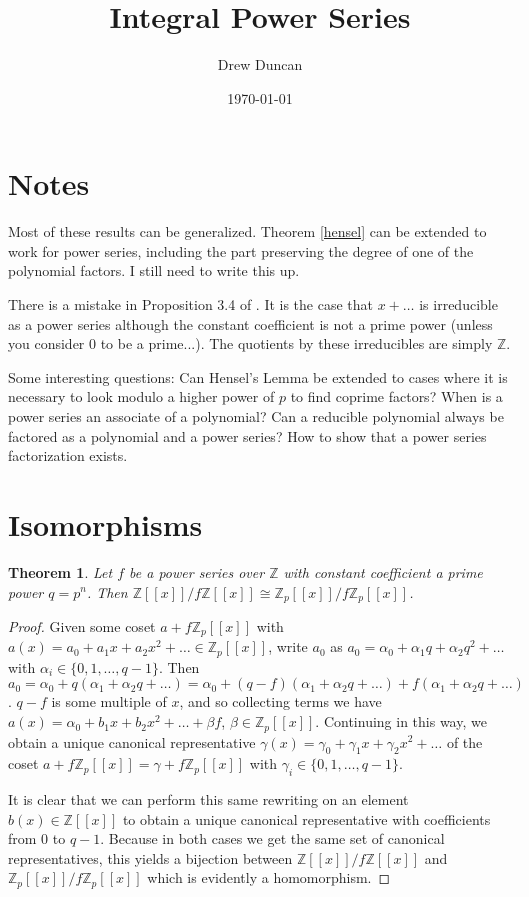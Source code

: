 \documentclass{article}
\title{Integral Power Series}
\author{Drew Duncan}
\date{\today}
\newtheorem{theorem}{Theorem}
\begin{document}
\maketitle

\section{Notes}
Most of these results can be generalized. Theorem \ref{hensel} can be extended to work for power series, including the part preserving the degree of one of the polynomial factors.  I still need to write this up.

There is a mistake in Proposition 3.4 of \cite{integerpowerseries_MR2416254}.  It is the case that $x + \ldots$ is irreducible as a power series although the constant coefficient is not a prime power (unless you consider 0 to be a prime...).  The quotients by these irreducibles are simply $\mathbb{Z}$.


Some interesting questions:  Can Hensel's Lemma be extended to cases where it is necessary to look modulo a higher power of $p$ to find coprime factors?  When is a power series an associate of a polynomial?  Can a reducible polynomial always be factored as a polynomial and a power series?  How to show that a power series factorization exists.

\section{Isomorphisms}
\begin{theorem} \label{iso1}
Let $f$ be a power series over $\mathbb{Z}$ with constant coefficient a prime power $q = p^n$.  Then $\mathbb{Z}[[x]]/f\mathbb{Z}[[x]] \cong \mathbb{Z}_p[[x]]/f\mathbb{Z}_p[[x]]$.
\end{theorem}
\begin{proof}
Given some coset $a + f\mathbb{Z}_p[[x]]$ with $a(x) = a_0 + a_1x + a_2x^2 + \ldots \in \mathbb{Z}_p[[x]]$, write $a_0$ as $a_0 = \alpha_0 + \alpha_1q + \alpha_2q^2 + \ldots$ with $\alpha_i \in \{0,1,\ldots,q-1\}$.  Then $a_0 = \alpha_0 + q(\alpha_1 + \alpha_2q + \ldots) = \alpha_0 + (q-f)(\alpha_1 + \alpha_2q + \ldots) + f(\alpha_1 + \alpha_2q + \ldots)$.  $q-f$ is some multiple of $x$, and so collecting terms we have $a(x) = \alpha_0 + b_1x + b_2x^2 + \ldots + \beta f$, $\beta \in \mathbb{Z}_p[[x]]$.  Continuing in this way, we obtain a unique canonical representative $\gamma(x) = \gamma_0 + \gamma_1x + \gamma_2x^2 + \ldots$ of the coset $a + f\mathbb{Z}_p[[x]] = \gamma + f\mathbb{Z}_p[[x]]$ with $\gamma_i \in \{0,1,\ldots,q-1\}$.

It is clear that we can perform this same rewriting on an element $b(x) \in \mathbb{Z}[[x]]$ to obtain a unique canonical representative with coefficients from $0$ to $q-1$.  Because in both cases we get the same set of canonical representatives, this yields a bijection between $\mathbb{Z}[[x]]/f\mathbb{Z}[[x]]$ and $\mathbb{Z}_p[[x]]/f\mathbb{Z}_p[[x]]$ which is evidently a homomorphism.
\end{proof}
\end{document}
